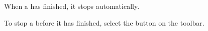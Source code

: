 
When a \gdsuite has finished, it stops automatically. 

To stop a \gdsuite before it has finished, select the
  button 
on the toolbar. 


